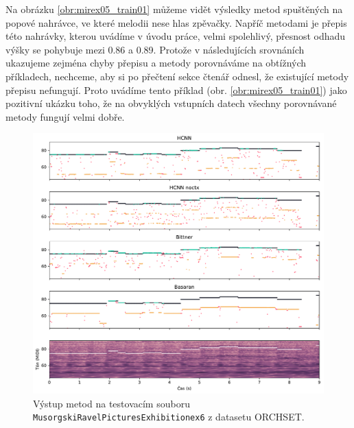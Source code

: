 Na obrázku \ref{obr:mirex05_train01} můžeme vidět výsledky metod spuštěných na popové nahrávce, ve které melodii nese hlas zpěvačky. Napříč metodami je přepis této nahrávky, kterou uvádíme v úvodu práce, velmi spolehlivý, přesnost odhadu výšky se pohybuje mezi 0.86 a 0.89. Protože v následujících srovnáních ukazujeme zejména chyby přepisu a metody porovnáváme na obtížných příkladech, nechceme, aby si po přečtení sekce čtenář odnesl, že existující metody přepisu nefungují. Proto uvádíme tento příklad (obr. \ref{obr:mirex05_train01}) jako pozitivní ukázku toho, že na obvyklých vstupních datech všechny porovnávané metody fungují velmi dobře.




\begin{figure}[h]\centering
\includegraphics[width=\textwidth,height=\textheight,keepaspectratio]{../img/vysledky/orchset_Musorgski-Ravel-PicturesExhibition-ex6}
\caption{Výstup metod na testovacím souboru \texttt{Musorg\allowbreak{}ski\-Ravel\-Pictures\allowbreak{}Exhibition\-ex6} z datasetu ORCHSET.}
\label{obr:orchset_Musorgski-Ravel-PicturesExhibition-ex6}
\end{figure}


